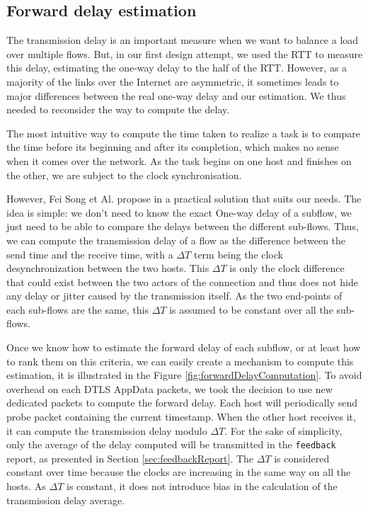 \subsection{Forward delay estimation}
The transmission delay is an important measure when we want to balance a load over multiple flows. But, in our first design attempt, we used the RTT to measure this delay, estimating the one-way delay to the half of the RTT. However, as a majority of the links over the Internet are asymmetric, it sometimes leads to major differences between the real one-way delay and our estimation. We thus needed to reconsider the way to compute the delay.

The most intuitive way to compute the time taken to realize a task is to compare the time before its beginning and after its completion, which makes no sense when it comes over the network. As the task begins on one host and finishes on the other, we are subject to the clock synchronisation.

However, Fei Song et Al. propose in \cite{song2009estimator} a practical solution that suits our needs. The idea is simple: we don't need to know the exact One-way delay of a subflow, we just need to be able to compare the delays between the different sub-flows. Thus, we can compute the transmission delay of a flow as the difference between the send time and the receive time, with a $\Delta T$ term being the clock desynchronization between the two hosts. This $\Delta T$ is only the clock difference that could exist between the two actors of the connection and thus does not hide any delay or jitter caused by the transmission itself. As the two end-points of each sub-flows are the same, this $\Delta T$ is assumed to be constant over all the sub-flows.

Once we know how to estimate the forward delay of each subflow, or at least how to rank them on this criteria, we can easily create a mechanism to compute this estimation, it is illustrated in the Figure \ref{fig:forwardDelayComputation}. To avoid overhead on each DTLS AppData packets, we took the decision to use new dedicated packets to compute the forward delay. Each host will periodically send probe packet containing the current timestamp. When the other host receives it, it can compute the transmission delay modulo $\Delta T$. For the sake of simplicity, only the average of the delay computed will be transmitted in the \texttt{feedback} report, as presented in Section \ref{sec:feedbackReport}. The $\Delta T$ is considered constant over time because the clocks are increasing in the same way on all the hosts. As $\Delta T$ is constant, it does not introduce bias in the calculation of the transmission delay average. 

